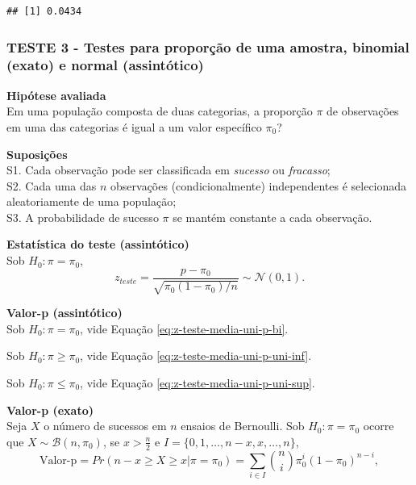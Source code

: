 \documentclass[
]{book}
\theoremstyle{definition}
\theoremstyle{definition}
\theoremstyle{definition}
\theoremstyle{remark}
\begin{document}
\begin{verbatim}
## [1] 0.0434
\end{verbatim}

\hypertarget{teste-3---testes-para-proporuxe7uxe3o-de-uma-amostra-binomial-exato-e-normal-assintuxf3tico}{%
\subsubsection*{TESTE 3 - Testes para proporção de uma amostra, binomial (exato) e normal (assintótico)}\label{teste-3---testes-para-proporuxe7uxe3o-de-uma-amostra-binomial-exato-e-normal-assintuxf3tico}}

\textbf{Hipótese avaliada}\\
Em uma população composta de duas categorias, a proporção \(\pi\) de observações em uma das categorias é igual a um valor específico \(\pi_0\)?

\textbf{Suposições}\\
S1. Cada observação pode ser classificada em \emph{sucesso} ou \emph{fracasso};\\
S2. Cada uma das \(n\) observações (condicionalmente) independentes é selecionada aleatoriamente de uma população;\\
S3. A probabilidade de sucesso \(\pi\) se mantém constante a cada observação.

\textbf{Estatística do teste (assintótico)}\\
Sob \(H_0: \pi = \pi_0\),
\begin{equation}
z_{teste}=\frac{p-\pi_0}{\sqrt{\pi_0 (1-\pi_0)/n}} \sim \mathcal{N}(0,1).
\label{eq:z-teste-prop-uni}
\end{equation}

\textbf{Valor-p (assintótico)}\\
Sob \(H_0: \pi = \pi_0\), vide Equação \eqref{eq:z-teste-media-uni-p-bi}.

Sob \(H_0: \pi \ge \pi_0\), vide Equação \eqref{eq:z-teste-media-uni-p-uni-inf}.

Sob \(H_0: \pi \le \pi_0\), vide Equação \eqref{eq:z-teste-media-uni-p-uni-sup}.

\textbf{Valor-p (exato)}\\
Seja \(X\) o número de sucessos em \(n\) ensaios de Bernoulli. Sob \(H_0: \pi = \pi_0\) ocorre que \(X \sim \mathcal{B}(n,\pi_0)\), se \(x>\frac{n}{2}\) e \(I = \{ 0,1,\ldots,n-x, x,\ldots,n \}\),
\begin{equation}
\text{Valor-p} = Pr(n-x \ge X \ge x | \pi = \pi_0) = \sum_{i \in I} {n \choose i} \pi_{0}^i (1-\pi_0)^{n-i},
\label{eq:binom-prop-uni-sup-xmaior}
\end{equation}
\end{document}
